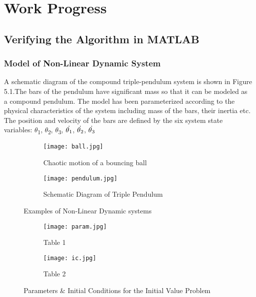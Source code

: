 \chapter{Work Progress}
\label{chap:work}
\setlength{\parskip}{1.5mm}
\section{Verifying the Algorithm in MATLAB}
\subsection{Model of Non-Linear Dynamic System}
A schematic diagram of the compound triple-pendulum system is shown in Figure 5.1.The bars of the pendulum have significant mass so that it can be modeled as a compound pendulum. The model has been parameterized according to the physical characteristics of the system including mass of the bars, their inertia etc. 
The position and velocity of the bars are defined by the six system state variables: $\theta$\textsubscript{1}, $\theta$\textsubscript{2}, $\theta$\textsubscript{3}, ${\dot{\theta\textsubscript{1}}}$, ${\dot{\theta\textsubscript{2}}}$, ${\dot{\theta\textsubscript{3}}}$

% 

\begin{figure}[H]
\begin{subfigure}{0.5\textwidth}
\texttt{[image: ball.jpg]}
\caption{Chaotic motion of a bouncing ball}\label{fig:ball}
\end{subfigure}
\begin{subfigure}{0.5\textwidth}
\texttt{[image: pendulum.jpg]}
\caption{Schematic Diagram of Triple Pendulum}\label{fig:pendulum}
\end{subfigure}
\caption{Examples of Non-Linear Dynamic systems}\label{fig:image1}

\end{figure}
\begin{figure}[h]
\begin{subfigure}{0.5\textwidth}
\texttt{[image: param.jpg]}
\caption{Table 1}\label{fig:param}
\end{subfigure}
\begin{subfigure}{0.5\textwidth}
\texttt{[image: ic.jpg]}
\caption{Table 2}\label{fig:ic}
\end{subfigure}
\caption{Parameters \& Initial Conditions for the Initial Value Problem}\label{fig:image2}
\end{figure}

